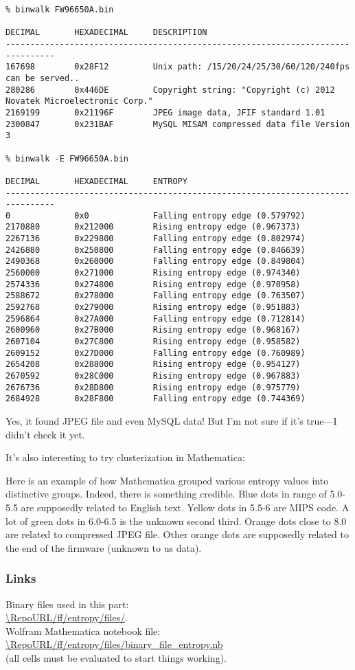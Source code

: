 \begin{lstlisting}
% binwalk FW96650A.bin 

DECIMAL       HEXADECIMAL     DESCRIPTION
--------------------------------------------------------------------------------
167698        0x28F12         Unix path: /15/20/24/25/30/60/120/240fps can be served..
280286        0x446DE         Copyright string: "Copyright (c) 2012 Novatek Microelectronic Corp."
2169199       0x21196F        JPEG image data, JFIF standard 1.01
2300847       0x231BAF        MySQL MISAM compressed data file Version 3

% binwalk -E FW96650A.bin 

DECIMAL       HEXADECIMAL     ENTROPY
--------------------------------------------------------------------------------
0             0x0             Falling entropy edge (0.579792)
2170880       0x212000        Rising entropy edge (0.967373)
2267136       0x229800        Falling entropy edge (0.802974)
2426880       0x250800        Falling entropy edge (0.846639)
2490368       0x260000        Falling entropy edge (0.849804)
2560000       0x271000        Rising entropy edge (0.974340)
2574336       0x274800        Rising entropy edge (0.970958)
2588672       0x278000        Falling entropy edge (0.763507)
2592768       0x279000        Rising entropy edge (0.951883)
2596864       0x27A000        Falling entropy edge (0.712814)
2600960       0x27B000        Rising entropy edge (0.968167)
2607104       0x27C800        Rising entropy edge (0.958582)
2609152       0x27D000        Falling entropy edge (0.760989)
2654208       0x288000        Rising entropy edge (0.954127)
2670592       0x28C000        Rising entropy edge (0.967883)
2676736       0x28D800        Rising entropy edge (0.975779)
2684928       0x28F800        Falling entropy edge (0.744369)
\end{lstlisting}

Yes, it found JPEG file and even MySQL data!
But I'm not sure if it's true---I didn't check it yet.

It's also interesting to try clusterization in Mathematica:



Here is an example of how Mathematica grouped various entropy values into distinctive groups.
Indeed, there is something credible. Blue dots in range of 5.0-5.5 are supposedly related to English text.
Yellow dots in 5.5-6 are MIPS code. A lot of green dots in 6.0-6.5 is the unknown second third.
Orange dots close to 8.0 are related to compressed JPEG file.
Other orange dots are supposedly related to the end of the firmware (unknown to us data).

\subsubsection{Links}

Binary files used in this part: \\
\url{\RepoURL/ff/entropy/files/}.\\
Wolfram Mathematica notebook file: \\
\url{\RepoURL/ff/entropy/files/binary_file_entropy.nb} \\
(all cells must be evaluated to start things working).

